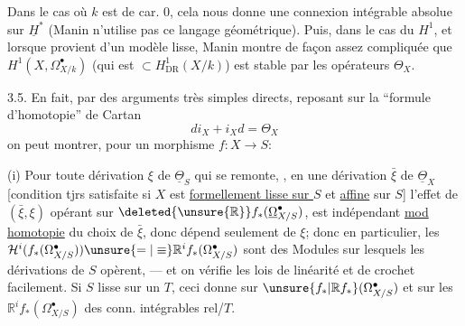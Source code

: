 Dans le cas où $k$ est de car. 0, cela nous donne une connexion intégrable absolue sur $\underline{H}^*$ (Manin n'utilise pas ce langage géométrique).
Puis, dans le cas du $H^1$, et lorsque  provient d'un modèle  lisse, Manin montre de façon assez compliquée que
$H^1(X,\Omega^\bullet_{X/k})$ (qui est $\subset H^1_{\mathrm{DR}}(X/k)$) est stable par les opérateurs $\Theta_X$.

3.5. En fait, par des arguments très simples directs,  reposant sur la ``formule d'homotopie'' de Cartan
\[
d i_X+i_X d=\Theta_X
\]
on peut montrer, pour un morphisme $f:X\longrightarrow S$:

(i) Pour toute dérivation $\xi$ de $\underline{\Theta}_S$ qui se remonte, ,  en une dérivation $\bar{\xi}$ de $\underline{\Theta}_X$ [condition tjrs satisfaite si $X$ est  \uline{formellement lisse sur $S$} et \uline{affine} sur $S$]
l'effet de $(\bar{\xi},\xi)$ opérant sur $\deleted{\unsure{\mathbb{R}}}f_*(\underline{\Omega}^\bullet_{X/S})$, est indépendant \uline{mod homotopie}  du choix de $\bar{\xi}$, donc dépend seulement de $\xi$; donc en particulier,  les
$\mathcal{H}^i(f_*(\Omega^\bullet_{X/S}))\unsure{=|\equiv}\mathbb{R}^if_*(\Omega^\bullet_{X/S})$
sont des Modules sur lesquels les dérivations de $S$ opèrent, --- et on vérifie les lois de linéarité et de crochet facilement.
Si $S$ lisse sur un $T$, ceci donne sur $\unsure{f_*|\mathbb{R}f_*}(\Omega^\bullet_{X/S})$ et sur les $\mathbb{R}^if_*(\Omega^\bullet_{X/S})$ des conn. intégrables rel/$T$.


